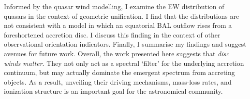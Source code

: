 \documentclass[a4paper, 11pt, twoside]{Thesis}  %
\begin{document}
{Informed by the quasar wind modelling, I examine the EW distribution
of quasars in the context of geometric unification. I find that the distributions
are not consistent with a model in which an equatorial BAL 
outflow rises from a foreshortened accretion disc. I discuss this finding
in the context of other observational orientation indicators.
Finally, I summarise my findings and suggest avenues for future work.
Overall, the work presented here suggests that {\em disc winds matter}. 
They not only act as a spectral `filter' for the underlying
accretion continuum, but may actually dominate the emergent spectrum from 
accreting objects. As a result, unveiling their driving mechanisms, 
mass-loss rates, and 
ionization structure is an important goal for the astronomical community. 
}

\cleardoublepage  %



\pagestyle{fancy}  %


\tableofcontents  %

\listoffigures  %

\listoftables  %

\end{document}
